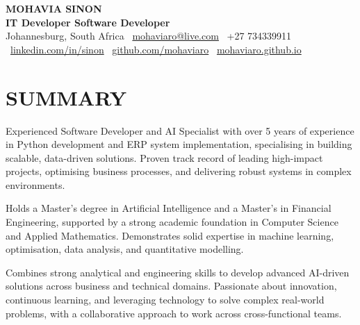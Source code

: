 \documentclass[10pt,a4paper]{article}
\begin{document}
\begin{center}
    {\LARGE \textbf{\color{primary} MOHAVIA SINON}} \\[0.25em]
    {\large \textbf{\color{secondary} IT Developer \quad\textbullet\quad Software Developer}} \\[0.5em]
    
    {\small \color{secondary}
        {\color{iconcolor}\faMapMarker*} Johannesburg, South Africa \quad\textbullet\quad
        {\color{iconcolor}\faEnvelope}\ \href{mailto:mohaviaro@live.com}{mohaviaro@live.com} \quad\textbullet\quad
        {\color{iconcolor}\faPhone*}\ +27 734339911
    } \\[0.3em]
    {\small
        {\color{iconcolor}\faLinkedin}\ \href{https://www.linkedin.com/in/sinon/}{linkedin.com/in/sinon} \quad\textbullet\quad
        {\color{iconcolor}\faGithub}\ \href{https://github.com/mohaviaro}{github.com/mohaviaro} \quad\textbullet\quad
        {\color{iconcolor}\faGlobe}\ \href{https://mohaviaro.github.io}{mohaviaro.github.io}
    }
\end{center}

\vspace{0.1em}

\section*{SUMMARY}
Experienced Software Developer and AI Specialist with over 5 years of experience in Python development and ERP system implementation, specialising in building scalable, data-driven solutions. Proven track record of leading high-impact projects, optimising business processes, and delivering robust systems in complex environments.

Holds a Master's degree in Artificial Intelligence and a Master's in Financial Engineering, supported by a strong academic foundation in Computer Science and Applied Mathematics. Demonstrates solid expertise in machine learning, optimisation, data analysis, and quantitative modelling.

Combines strong analytical and engineering skills to develop advanced AI-driven solutions across business and technical domains. Passionate about innovation, continuous learning, and leveraging technology to solve complex real-world problems, with a collaborative approach to work across cross-functional teams.
\end{document}
